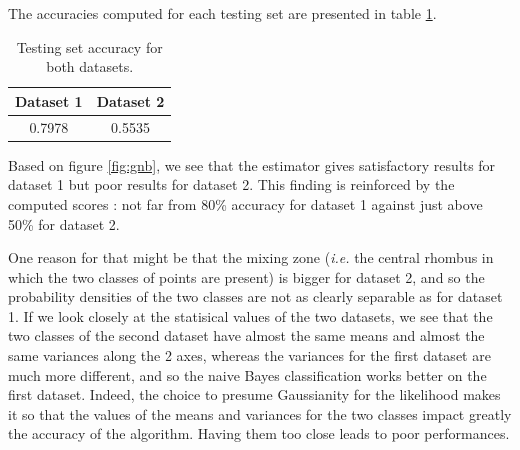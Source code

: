 The accuracies computed for each testing set are presented in table \ref{tab:gnb_accuracies}.
\begin{table}[H]
    \centering
    \begin{tabular}{|c|c|}
        \hline
        {\bf Dataset 1} & {\bf Dataset 2}\\ \hline
        \hline
        \num{0.7978} & \num{0.5535} \\ \hline
    \end{tabular}
    \caption{Testing set accuracy for both datasets.}
    \label{tab:gnb_accuracies}
\end{table}
Based on figure \ref{fig:gnb}, we see that the estimator gives satisfactory results for dataset 1 but poor results for dataset 2. This finding is reinforced by the computed scores : not far from \num{80}\% accuracy for dataset 1 against just above \num{50}\% for dataset 2.\par
One reason for that might be that the \og{}mixing zone\fg{} (\textit{i.e.} the central rhombus in which the two classes of points are present) is bigger for dataset 2, and so the probability densities of the two classes are not as clearly separable as for dataset 1. If we look closely at the statisical values of the two datasets, we see that the two classes of the second dataset have almost the same means and almost the same variances along the 2 axes, whereas the variances for the first dataset are much more different, and so the naive Bayes classification works better on the first dataset. Indeed, the choice to presume Gaussianity for the likelihood makes it so that the values of the means and variances for the two classes impact greatly the accuracy of the algorithm. Having them too close leads to poor performances.
